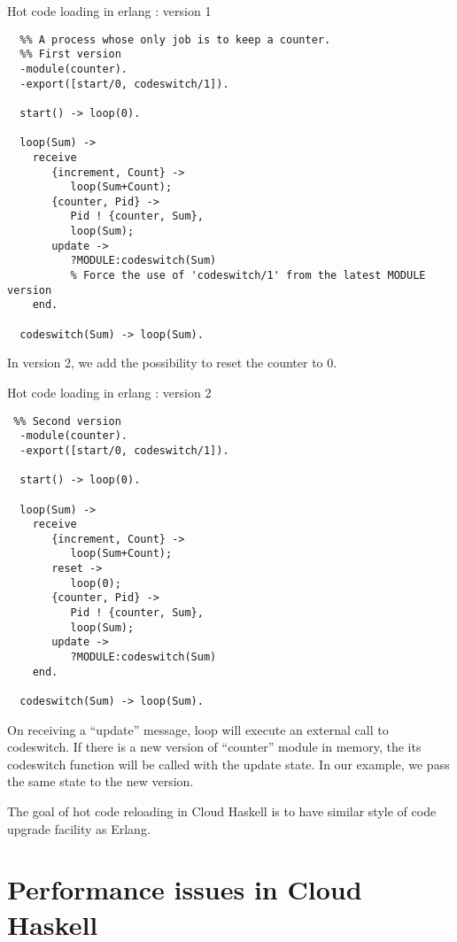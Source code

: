 \begin{program}
\caption[An example of hot code loading]
{Hot code loading in erlang : version 1}
\label{fig:erlang-v1}

\begin{verbatim}
  %% A process whose only job is to keep a counter.
  %% First version
  -module(counter).
  -export([start/0, codeswitch/1]).

  start() -> loop(0).

  loop(Sum) ->
    receive
       {increment, Count} ->
          loop(Sum+Count);
       {counter, Pid} ->
          Pid ! {counter, Sum},
          loop(Sum);
       update ->
          ?MODULE:codeswitch(Sum)
          % Force the use of 'codeswitch/1' from the latest MODULE version
    end.

  codeswitch(Sum) -> loop(Sum).
\end{verbatim}
\end{program}

In version 2, we add the possibility to reset the counter to 0.

\begin{program}
\caption[An example of hot code loading]
{Hot code loading in erlang : version 2}
\label{fig:erlang-v2}

\begin{verbatim}
 %% Second version
  -module(counter).
  -export([start/0, codeswitch/1]).

  start() -> loop(0).

  loop(Sum) ->
    receive
       {increment, Count} ->
          loop(Sum+Count);
       reset ->
          loop(0);
       {counter, Pid} ->
          Pid ! {counter, Sum},
          loop(Sum);
       update ->
          ?MODULE:codeswitch(Sum)
    end.

  codeswitch(Sum) -> loop(Sum).
\end{verbatim}
\end{program}

On receiving a ``update'' message, loop will execute an external call
to codeswitch. If there is a new version of ``counter'' module in
memory, the its codeswitch function will be called with the update
state. In our example, we pass the same state to the new version.

The goal of hot code reloading in Cloud Haskell is to have similar
style of code upgrade facility as Erlang.

\section{Performance issues in Cloud Haskell}

